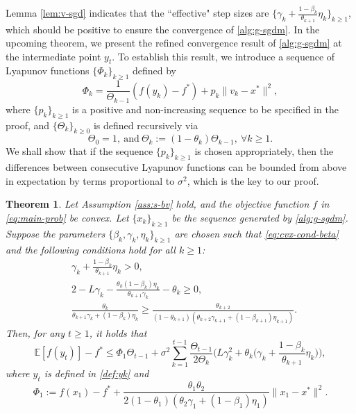 \documentclass[10pt]{article}
\numberwithin{equation}{section}
\newtheorem{theorem}{Theorem}
\theoremstyle{definition}
\newcommand{\ebb}{\mathbb{E}}  %
\begin{document}
Lemma \ref{lem:v-sgd} indicates that the ``effective" step sizes are $\{\gamma_k+\frac{1-\beta_k}{\theta_{k+1}}\eta_k\}_{k\ge 1}$, which should be positive to ensure the convergence of \eqref{alg:g-sgdm}.
In the upcoming theorem, we present the refined convergence result of \eqref{alg:g-sgdm} at the intermediate point $y_t$. To establish this result, we introduce a sequence of Lyapunov functions $\{\Phi_k\}_{k\ge 1}$ defined by
\begin{equation}\label{def:Phi_k}
    \Phi_k=\frac{1}{\Theta_{k-1}}(f(y_k)-f^*)+p_k\|v_k-x^*\|^2,
\end{equation}
where $\{p_k\}_{k\ge 1}$ is a positive and non-increasing sequence to be specified in the proof, and $\{\Theta_k\}_{k\ge 0}$ is defined recursively via
\begin{equation}\label{def:Theta}
    \Theta_0=1,~\text{and}~\Theta_k := (1-\theta_k)\Theta_{k-1},~\forall k\ge 1.
\end{equation}
%
%
%
%
We shall show that if the sequence $\{p_k\}_{k\ge 1}$ is chosen appropriately, then the differences between consecutive Lyapunov functions can be bounded from above in expectation by terms proportional to $\sigma^2$, which is the key to our proof. 
\begin{theorem}\label{thm:cvx-vary}
Let Assumption \ref{ass:s-bv} hold, and the objective function $f$ in \eqref{eq:main-prob} be convex. Let $\{x_k\}_{k\ge 1}$ be the sequence generated by \eqref{alg:g-sgdm}. Suppose the parameters $\{\beta_k, \gamma_k, \eta_k\}_{k\ge 1}$ are chosen such that \eqref{eq:cvx-cond-beta} and the following conditions hold for all $k\ge 1$:
\begin{align}
    &\gamma_k+\frac{1-\beta_k}{\theta_{k+1}}\eta_k> 0,\label{eq:cvx-lr-0}\\
    &2-L \gamma_k-\frac{\theta_k(1-\beta_k)\eta_k}{\theta_{k+1}\gamma_k}-\theta_k\ge 0,\label{eq:cvx-lr-1}\\
    &\frac{\theta_k}{\theta_{k+1}\gamma_k+(1-\beta_k)\eta_k} \ge \frac{\theta_{k+2}}{(1-\theta_{k+1})(\theta_{k+2}\gamma_{k+1}+(1-\beta_{k+1})\eta_{k+1})}.\label{eq:cvx-lr-2}
\end{align}
Then, for any $t\ge 1$, it holds that
\begin{equation}\label{eq:rate-general}
    \ebb[f(y_t)]-f^*\leq \Phi_1\Theta_{t-1}+\sigma^2\sum_{k=1}^{t-1}\frac{\Theta_{t-1}}{2\Theta_k}\Big(L \gamma_k^2+\theta_k\Big(\gamma_k+\frac{1-\beta_k}{\theta_{k+1}}\eta_k\Big)\Big),
\end{equation}
where $y_t$ is defined in \eqref{def:yk} and 
\begin{equation}\label{def:Phi_1}
    \Phi_1:=f(x_1)-f^*+\frac{\theta_1\theta_2}{2(1-\theta_1)(\theta_2\gamma_1+(1-\beta_1)\eta_1)}\|x_1-x^*\|^2.
\end{equation}
%
\end{theorem}
\end{document}
